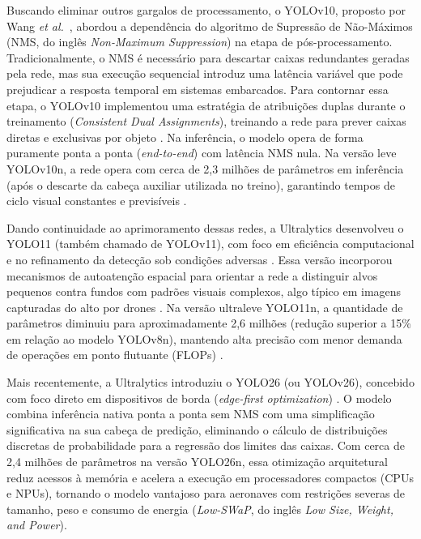Buscando eliminar outros gargalos de processamento, o YOLOv10, proposto por Wang \textit{et al.}~\cite{wang2024_yolov10}, abordou a dependência do algoritmo de Supressão de Não-Máximos (NMS, do inglês \textit{Non-Maximum Suppression}) na etapa de pós-processamento. Tradicionalmente, o NMS é necessário para descartar caixas redundantes geradas pela rede, mas sua execução sequencial introduz uma latência variável que pode prejudicar a resposta temporal em sistemas embarcados. Para contornar essa etapa, o YOLOv10 implementou uma estratégia de atribuições duplas durante o treinamento (\textit{Consistent Dual Assignments}), treinando a rede para prever caixas diretas e exclusivas por objeto \cite{wang2024_yolov10}. Na inferência, o modelo opera de forma puramente ponta a ponta (\textit{end-to-end}) com latência NMS nula. Na versão leve YOLOv10n, a rede opera com cerca de 2,3 milhões de parâmetros em inferência (após o descarte da cabeça auxiliar utilizada no treino), garantindo tempos de ciclo visual constantes e previsíveis \cite{wang2024_yolov10}.

Dando continuidade ao aprimoramento dessas redes, a Ultralytics desenvolveu o YOLO11 (também chamado de YOLOv11), com foco em eficiência computacional e no refinamento da detecção sob condições adversas \cite{yolo11_ultralytics}. Essa versão incorporou mecanismos de autoatenção espacial para orientar a rede a distinguir alvos pequenos contra fundos com padrões visuais complexos, algo típico em imagens capturadas do alto por drones \cite{yolo11_ultralytics, zhexebay2025}. Na versão ultraleve YOLO11n, a quantidade de parâmetros diminuiu para aproximadamente 2,6 milhões (redução superior a 15\% em relação ao modelo YOLOv8n), mantendo alta precisão com menor demanda de operações em ponto flutuante (FLOPs) \cite{yolo11_ultralytics, zhexebay2025}.

Mais recentemente, a Ultralytics introduziu o YOLO26 (ou YOLOv26), concebido com foco direto em dispositivos de borda (\textit{edge-first optimization}) \cite{yolo26_ultralytics}. O modelo combina inferência nativa ponta a ponta sem NMS com uma simplificação significativa na sua cabeça de predição, eliminando o cálculo de distribuições discretas de probabilidade para a regressão dos limites das caixas. Com cerca de 2,4 milhões de parâmetros na versão YOLO26n, essa otimização arquitetural reduz acessos à memória e acelera a execução em processadores compactos (CPUs e NPUs), tornando o modelo vantajoso para aeronaves com restrições severas de tamanho, peso e consumo de energia (\textit{Low-SWaP}, do inglês \textit{Low Size, Weight, and Power}).

